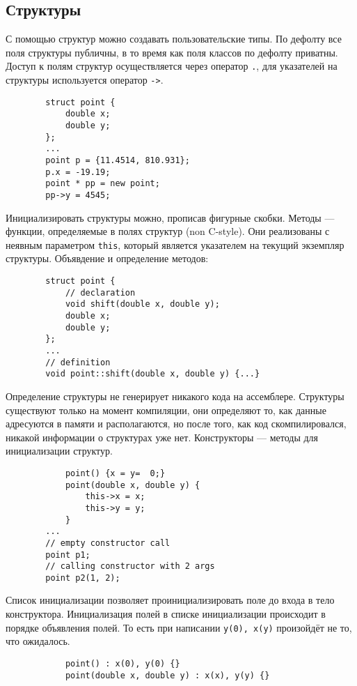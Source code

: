 \documentclass[15pt, a4paper]{article}
\newcommand{\nl}{\newline}
\begin{document}
    \subsection{Структуры}
    С помощью структур можно создавать пользовательские типы. По дефолту все поля структуры публичны,
    в то время как поля классов по дефолту приватны. \nl
    Доступ к полям структур осуществляется через оператор \texttt{.}, для указателей на структуры используется
    оператор \texttt{->}.
    \begin{verbatim}
        struct point {
        	double x;
            double y;
        };
        ...
        point p = {11.4514, 810.931};
        p.x = -19.19;
        point * pp = new point;
        pp->y = 4545;
    \end{verbatim}
    Инициализировать структуры можно, прописав фигурные скобки. \nl
    Методы --- функции, определяемые в полях структур (non C-style). Они  реализованы с неявным параметром
    \texttt{this}, который является указателем на текущий экземпляр структуры.
    Объявдение и определение методов:
    \begin{verbatim}
    	struct point {
        	// declaration
        	void shift(double x, double y);
        	double x;
            double y;
        };
        ...
        // definition
        void point::shift(double x, double y) {...}        
    \end{verbatim}
    Определение структуры не генерирует никакого кода на ассемблере. Структуры существуют только на
    момент компиляции, они определяют то, как данные адресуются в памяти и располагаются, но после того,
    как код скомпилировался, никакой информации о структурах уже нет. \nl
    Конструкторы --- методы для инициализации структур.
    \begin{verbatim}
        	point() {x = y=  0;}
            point(double x, double y) {
            	this->x = x;
                this->y = y;
            }
        ...
        // empty constructor call
        point p1;
        // calling constructor with 2 args
        point p2(1, 2);
    \end{verbatim}
    Список инициализации позволяет проинициализировать поле до входа в тело конструктора. Инициализация
    полей в списке инициализации происходит в порядке объявления полей. То есть при написании \texttt{y(0),
    x(y)} произойдёт не то, что ожидалось.
    \begin{verbatim}
        	point() : x(0), y(0) {}
            point(double x, double y) : x(x), y(y) {}
    \end{verbatim}
\end{document}
